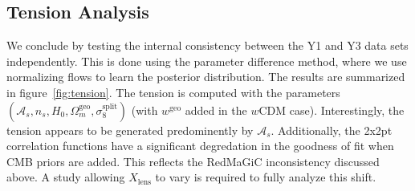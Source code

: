 \subsection{Tension Analysis}
We conclude by testing the internal consistency between the Y1 and Y3 data sets independently. This is done using the parameter difference method, where we use normalizing flows to learn the posterior distribution. The results are summarized in figure~\ref{fig:tension}. The tension is computed with the parameters $(\mathcal{A}_s,n_s,H_0,\Omega_m^{\mathrm{geo}},\sigma_8^\mathrm{split})$ (with $w^{\mathrm{geo}}$ added in the $w$CDM case). Interestingly, the tension appears to be generated predominently by $\mathcal{A}_s$. Additionally, the 2x2pt correlation functions have a significant degredation in the goodness of fit when CMB priors are added. This reflects the RedMaGiC inconsistency discussed above. A study allowing $X_\mathrm{lens}$ to vary is required to fully analyze this shift.

